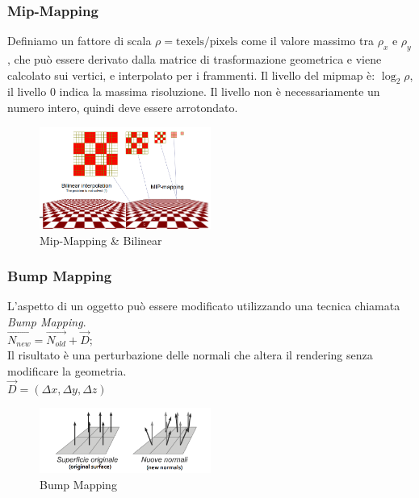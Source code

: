 \subsubsection{Mip-Mapping}
Definiamo un fattore di scala $\rho = \text{texels/pixels}$ come il valore massimo tra $\rho_x$ e $\rho_y$, che può essere derivato dalla matrice di trasformazione geometrica e viene calcolato sui vertici, e interpolato per i frammenti. Il livello del mipmap è: $\log_2 \rho$, il livello 0 indica la massima risoluzione. Il livello non è necessariamente un numero intero, quindi deve essere arrotondato.
\begin{figure}[H]
    \centering
    \includegraphics[width=0.5\textwidth]{images/MipMap.png} 
    \caption{Mip-Mapping \& Bilinear}
    \label{fig:immagine}
\end{figure}
\subsubsection{Bump Mapping}

L'aspetto di un oggetto può essere modificato utilizzando una tecnica chiamata \textit{Bump Mapping}.\\
$\vec{N_{new}}={\vec{N_{old}}}+\vec{D};$ \\
Il risultato è una perturbazione delle normali che altera il rendering senza modificare la geometria.\\
$\vec{D}=(\Delta x,\Delta y, \Delta z)$
\begin{figure}[H]
    \centering
    \includegraphics[width=0.5\textwidth]{images/Bump2.png} 
    \caption{Bump Mapping}
    \label{fig:immagine}
\end{figure}
